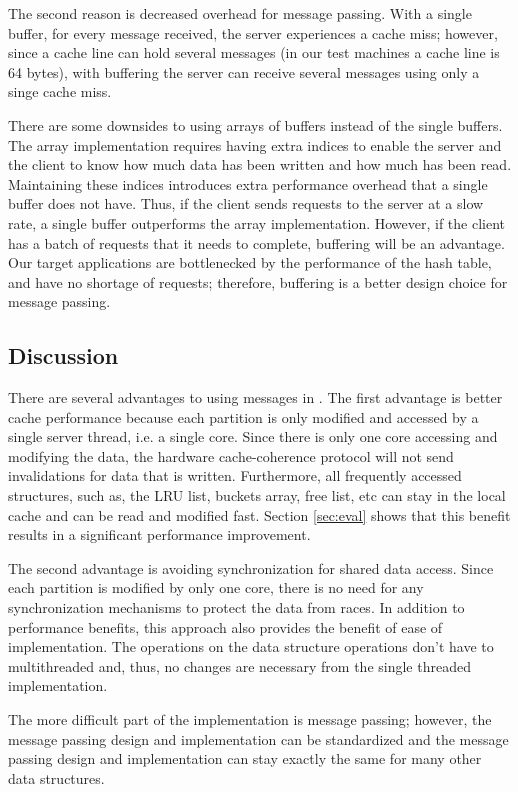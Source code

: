 The second reason is decreased overhead for message passing.  With a single
buffer, for every message received, the server experiences a cache miss;
however, since a cache line can hold several messages (in our test machines a
cache line is 64 bytes), with buffering the server can receive several messages
using only a singe cache miss.

There are some downsides to using arrays of buffers instead of the single
buffers.  The array implementation requires having extra indices to enable the
server and the client to know how much data has been written and how much has
been read. Maintaining these indices introduces extra performance overhead that
a single buffer does not have. Thus, if the client sends requests to the server
at a slow rate, a single buffer outperforms the array implementation. However,
if the client has a batch of requests that it needs to complete, buffering will
be an advantage. Our target applications are bottlenecked by the performance of
the hash table, and have no shortage of requests; therefore, buffering is a
better design choice for message passing.

\subsection{Discussion}
\label{sec:compmigration}

There are several advantages to using messages in \cphash{}. The first advantage
is better cache performance because each partition is only modified and accessed
by a single server thread, i.e. a single core.  Since there is only one core
accessing and modifying the data, the hardware cache-coherence protocol will not
send invalidations for data that is written. Furthermore, all frequently
accessed structures, such as, the LRU list, buckets array, free list, etc can
stay in the local cache and can be read and modified fast.  Section
\ref{sec:eval} shows that this benefit results in a significant performance
improvement.

The second advantage is avoiding synchronization for shared data access. Since
each partition is modified by only one core, there is no need for any
synchronization mechanisms to protect the data from races. In addition to
performance benefits, this approach also provides the benefit of ease of
implementation.  The operations on the data structure operations don't have to
multithreaded and, thus, no changes are necessary from the single threaded
implementation.

The more difficult part of the \cphash{} implementation is message passing;
however, the message passing design and implementation can be standardized and
the message passing design and implementation can stay exactly the same for many
other data structures.

